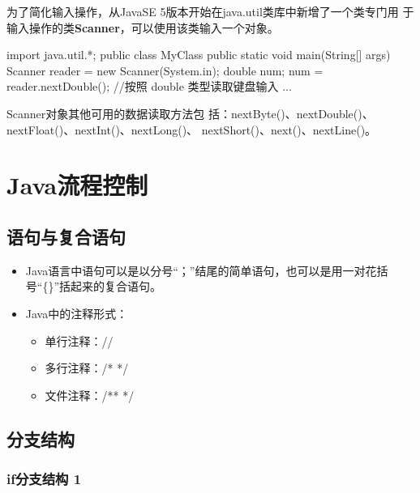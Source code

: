 为了简化输入操作，从JavaSE 5版本开始在java.util类库中新增了一个类专门用
于输入操作的类{\bf\Red Scanner}，可以使用该类输入一个对象。


\begin{javaCode}
  import java.util.*;
  public class MyClass {
    public static void main(String[] args)
    {
      Scanner reader = new Scanner(System.in); 
      double num;
      num = reader.nextDouble(); //按照 double 类型读取键盘输入
      ...
    }
  }
\end{javaCode}

Scanner对象其他可用的数据读取方法包
括：nextByte()、nextDouble()、nextFloat()、nextInt()、nextLong()、
nextShort()、next()、nextLine()。

\section{Java流程控制}

\subsection{语句与复合语句}

\begin{itemize}
 \item Java语言中语句可以是以分号“；”结尾的简单语句，也可以是用一对花括号“\{\}”括起来的复合语句。
 \item Java中的注释形式：
   \begin{itemize}\small\Blue
   \item 单行注释：//
   \item 多行注释：/*    */
   \item 文件注释：/**   */
   \end{itemize}
\end{itemize}

\subsection{分支结构}

\subsubsection{if分支结构 1}

